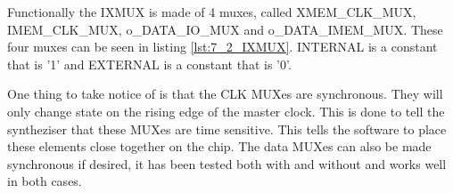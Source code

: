 Functionally the IXMUX is made of 4 muxes, called XMEM\_CLK\_MUX, IMEM\_CLK\_MUX, o\_DATA\_IO\_MUX and o\_DATA\_IMEM\_MUX. These four muxes can be seen in listing \ref{lst:7_2_IXMUX}. INTERNAL is a constant that is '1' and EXTERNAL is a constant that is '0'.



One thing to take notice of is that the CLK MUXes are synchronous. They will only change state on the rising edge of the  master clock. This is done to tell the syntheziser that these MUXes are time sensitive. This tells the software to place these elements close together on the chip. The data MUXes can also be made synchronous if desired, it has been tested both with and without and works well in both cases. 